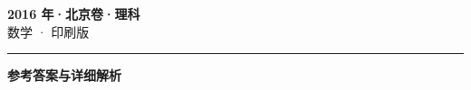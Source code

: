\documentclass[zihao=5, a4paper]{ctexart}
\begin{document}
\begin{center}
  {\Large\bfseries 2016 年·北京卷·理科}\\[4pt]
  {\large 数学 · 印刷版}
\end{center}
\medskip
{}

\par\bigskip\hrule\bigskip
{}
\begin{center}{\large\bfseries 参考答案与详细解析}\end{center}
\smallskip

\end{document}
